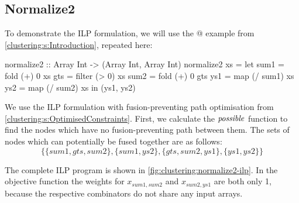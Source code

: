 \subsection{Normalize2}
To demonstrate the ILP formulation, we will use the @ example from \cref{clustering:s:Introduction}, repeated here:
\begin{haskell}
normalize2 :: Array Int -> (Array Int, Array Int)
normalize2 xs
 = let sum1 = fold   (+)  0   xs
       gts  = filter (>   0)  xs
       sum2 = fold   (+)  0   gts
       ys1  = map    (/ sum1) xs
       ys2  = map    (/ sum2) xs
   in (ys1, ys2)
\end{haskell}

We use the ILP formulation with fusion-preventing path optimisation from \cref{clustering:s:OptimisedConstraints}.
First, we calculate the $\mathit{possible}$ function to find the nodes which have no fusion-preventing path between them.
The sets of nodes which can potentially be fused together are as follows:
\[ \{ \{sum1, gts, sum2\}
 , \{sum1, ys2\}
 , \{gts, sum2, ys1\}
 , \{ys1, ys2\} \} \]

The complete ILP program is shown in \cref{fig:clustering:normalize2-ilp}.
In the objective function the weights for $x_{sum1, sum2}$ and $x_{sum2, ys1}$ are both only 1, because the respective combinators do not share any input arrays.

